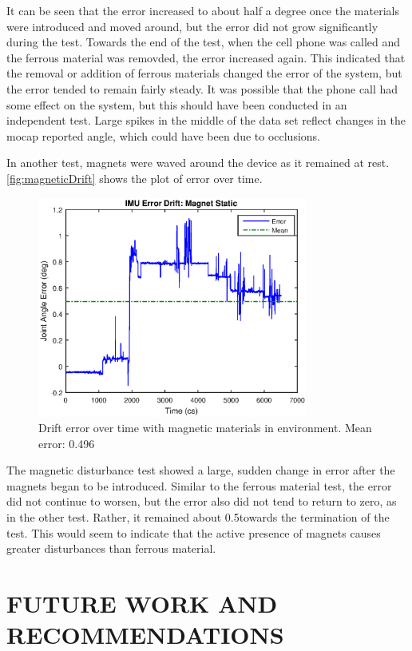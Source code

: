 \documentclass[letterpaper, 10 pt, conference]{ieeeconf}  %
\begin{document}
It can be seen that the error increased to about half a degree once the materials were introduced and moved around, but the error did not grow significantly during the test. Towards the end of the test, when the cell phone was called and the ferrous material was removded, the error increased again. This indicated that the removal or addition of ferrous materials changed the error of the system, but the error tended to remain fairly steady. It was possible that the phone call had some effect on the system, but this should have been conducted in an independent test. Large spikes in the middle of the data set reflect changes in the mocap reported angle, which could have been due to occlusions.

In another test, magnets were waved around the device as it remained at rest. \autoref{fig:magneticDrift} shows the plot of error over time.
\begin{figure}[thpb]
	\centering
	\includegraphics[width = 3.5in]{magnet_static_drift.eps}
    \caption{Drift error over time with magnetic materials in environment. Mean error: 0.496\degree}
    \label{fig:magneticDrift}
\end{figure}

The magnetic disturbance test showed a large, sudden change in error after the magnets began to be introduced. Similar to the ferrous material test, the error did not continue to worsen, but the error also did not tend to return to zero, as in the other test. Rather, it remained about 0.5\degree towards the termination of the test. This would seem to indicate that the active presence of magnets causes greater disturbances than ferrous material. 

\section{FUTURE WORK AND RECOMMENDATIONS}
\end{document}
